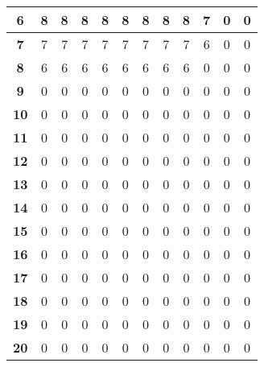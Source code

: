 \documentclass[11pt,a4paper,oneside]{report}
\begin{document}
\begin{table}[H]
\begin{tabular}{|c|c|c|c|c|c|c|c|c|c|c|c|}
\textbf{6}       & 8          & 8          & 8          & 8          & 8          & 8          & 8          & 8          & 7          & 0          & 0           \\ \hline
\textbf{7}       & 7          & 7          & 7          & 7          & 7          & 7          & 7          & 7          & 6          & 0          & 0           \\ \hline
\textbf{8}       & 6          & 6          & 6          & 6          & 6          & 6          & 6          & 6          & 0          & 0          & 0           \\ \hline
\textbf{9}       & 0          & 0          & 0          & 0          & 0          & 0          & 0          & 0          & 0          & 0          & 0           \\ \hline
\textbf{10}      & 0          & 0          & 0          & 0          & 0          & 0          & 0          & 0          & 0          & 0          & 0           \\ \hline
\textbf{11}      & 0          & 0          & 0          & 0          & 0          & 0          & 0          & 0          & 0          & 0          & 0           \\ \hline
\textbf{12}      & 0          & 0          & 0          & 0          & 0          & 0          & 0          & 0          & 0          & 0          & 0           \\ \hline
\textbf{13}      & 0          & 0          & 0          & 0          & 0          & 0          & 0          & 0          & 0          & 0          & 0           \\ \hline
\textbf{14}      & 0          & 0          & 0          & 0          & 0          & 0          & 0          & 0          & 0          & 0          & 0           \\ \hline
\textbf{15}      & 0          & 0          & 0          & 0          & 0          & 0          & 0          & 0          & 0          & 0          & 0           \\ \hline
\textbf{16}      & 0          & 0          & 0          & 0          & 0          & 0          & 0          & 0          & 0          & 0          & 0           \\ \hline
\textbf{17}      & 0          & 0          & 0          & 0          & 0          & 0          & 0          & 0          & 0          & 0          & 0           \\ \hline
\textbf{18}      & 0          & 0          & 0          & 0          & 0          & 0          & 0          & 0          & 0          & 0          & 0           \\ \hline
\textbf{19}      & 0          & 0          & 0          & 0          & 0          & 0          & 0          & 0          & 0          & 0          & 0           \\ \hline
\textbf{20}      & 0          & 0          & 0          & 0          & 0          & 0          & 0          & 0          & 0          & 0          & 0           \\ \hline
\end{tabular}
\end{table}
\end{document}
